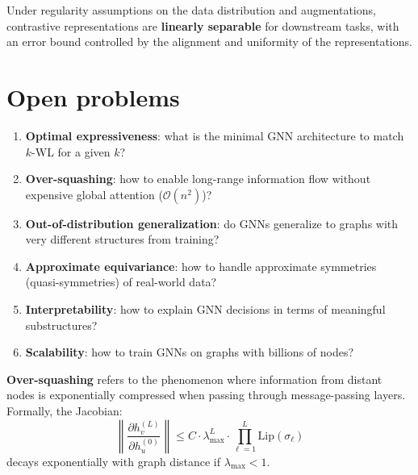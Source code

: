 \begin{theorem}
Under regularity assumptions on the data distribution and
augmentations, contrastive representations are \textbf{linearly
separable} for downstream tasks, with an error bound controlled
by the alignment and uniformity of the representations.
\end{theorem}

\section{Open problems}
\label{sec:open_problems}

\begin{remark}
\begin{enumerate}
  \item \textbf{Optimal expressiveness}: what is the minimal GNN
        architecture to match $k$-WL for a given $k$?
  \item \textbf{Over-squashing}: how to enable long-range
        information flow without expensive global attention
        ($\mathcal{O}(n^2)$)?
  \item \textbf{Out-of-distribution generalization}: do GNNs
        generalize to graphs with very different structures from
        training?
  \item \textbf{Approximate equivariance}: how to handle
        approximate symmetries (quasi-symmetries) of real-world
        data?
  \item \textbf{Interpretability}: how to explain GNN decisions
        in terms of meaningful substructures?
  \item \textbf{Scalability}: how to train GNNs on graphs with
        billions of nodes?
\end{enumerate}
\end{remark}

\begin{definition}
\textbf{Over-squashing} refers to the phenomenon where information
from distant nodes is exponentially compressed when passing through
message-passing layers. Formally, the Jacobian:
\[
  \left\|\frac{\partial h_v^{(L)}}{\partial h_u^{(0)}}\right\|
  \leq C \cdot \lambda_{\max}^L \cdot
  \prod_{\ell=1}^L \mathrm{Lip}(\sigma_\ell)
\]
decays exponentially with graph distance if $\lambda_{\max} < 1$.
\end{definition}

